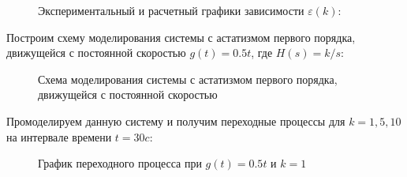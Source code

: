 \documentclass[a4paper, 11pt]{article}
\begin{document}
\newpage
\begin{figure}[h!]
\caption{Экспериментальный и расчетный графики зависимости $\varepsilon(k)$:}
\label{ris:image}
\end{figure}

\par 
Построим схему моделирования системы с астатизмом первого порядка, движущейся с постоянной скоростью $g(t) = 0.5t$, где $H(s)=k/s$:

\begin{figure}[h!]
\caption{Схема моделирования системы с астатизмом первого порядка, движущейся с постоянной скоростью}
\label{ris:image}
\end{figure}

\par 
Промоделируем данную систему и получим переходные процессы для $k = 1, 5, 10$ на интервале времени $t = 30c$:

\newpage
\begin{figure}[h!]
\caption{График переходного процесса при $g(t) = 0.5t$ и $k = 1$}
\label{ris:image}
\end{figure}
\end{document}
